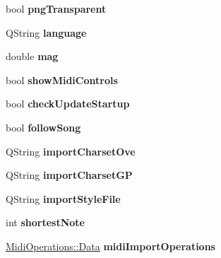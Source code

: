 \begin{DoxyCompactItemize}
\item 
\mbox{\label{struct_ms_1_1_preferences_a8a030ccc47e6b43d96bb8fdd1d267bc5}} 
bool {\bfseries png\+Transparent}
\item 
\mbox{\label{struct_ms_1_1_preferences_a0cff305b363e155161ca52de418c544f}} 
Q\+String {\bfseries language}
\item 
\mbox{\label{struct_ms_1_1_preferences_af05f2c63ccd0f4a952c39d6ea3a377ef}} 
double {\bfseries mag}
\item 
\mbox{\label{struct_ms_1_1_preferences_a0753f4c692e07b0b9f102d0947f3fab4}} 
bool {\bfseries show\+Midi\+Controls}
\item 
\mbox{\label{struct_ms_1_1_preferences_a5178a03537cb2c180e1c94ee21bf5adc}} 
bool {\bfseries check\+Update\+Startup}
\item 
\mbox{\label{struct_ms_1_1_preferences_aa67c0de705cff951e4c6b6f94a32f08d}} 
bool {\bfseries follow\+Song}
\item 
\mbox{\label{struct_ms_1_1_preferences_a645fd69d3087c0e37a77ad8e0422093e}} 
Q\+String {\bfseries import\+Charset\+Ove}
\item 
\mbox{\label{struct_ms_1_1_preferences_a80156dc21fefdc63838ae79979599498}} 
Q\+String {\bfseries import\+Charset\+GP}
\item 
\mbox{\label{struct_ms_1_1_preferences_a46b68fd0e8a2e625f042d47118ebbaf3}} 
Q\+String {\bfseries import\+Style\+File}
\item 
\mbox{\label{struct_ms_1_1_preferences_ad34bf6f449c50ce44bc43c61ef8f8d12}} 
int {\bfseries shortest\+Note}
\item 
\mbox{\label{struct_ms_1_1_preferences_abcdfd698d20e19c6025cfa0dd975cf92}} 
\hyperlink{class_ms_1_1_midi_operations_1_1_data}{Midi\+Operations\+::\+Data} {\bfseries midi\+Import\+Operations}

\end{DoxyCompactItemize}
